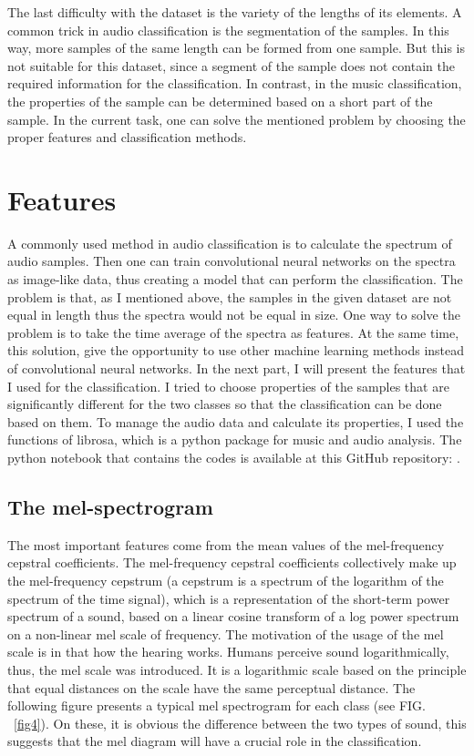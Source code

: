 \documentclass[12pt a4paper]{article}
\numberwithin{equation}{section}
\begin{document}
The last difficulty with the dataset is the variety of the lengths of its elements. A common trick in audio classification is the segmentation of the samples. In this way, more samples of the same length can be formed from one sample.  But this is not suitable for this dataset, since a segment of the sample does not contain the required information for the classification. In contrast, in the music classification, the properties of the sample can be determined based on a short part of the sample. In the current task, one can solve the mentioned problem by choosing the proper features and classification methods.

\section{Features}

A commonly used method in audio classification is to calculate the spectrum of audio samples. Then one can train convolutional neural networks on the spectra as image-like data, thus creating a model that can perform the classification. The problem is that, as I mentioned above, the samples in the given dataset are not equal in length thus the spectra would not be equal in size.  One way to solve the problem is to take the time average of the spectra as features. At the same time, this solution, give the opportunity to use other machine learning methods instead of convolutional neural networks. In the next part, I will present the features that I used for the classification. I tried to choose properties of the samples that are significantly different for the two classes so that the classification can be done based on them. To manage the audio data and calculate its properties, I used the functions of librosa, which is a python package for music and audio analysis. The python notebook that contains the codes is available at this GitHub repository: \cite{repo}.
 
\subsection{The mel-spectrogram}

The most important features come from the mean values of the mel-frequency cepstral coefficients. The mel-frequency cepstral coefficients collectively make up the mel-frequency cepstrum (a cepstrum is a spectrum of the logarithm of the spectrum of the time signal), which is a representation of the short-term power spectrum of a sound, based on a linear cosine transform of a log power spectrum on a non-linear mel scale of frequency. The motivation of the usage of the mel scale is in that how the hearing works.  Humans perceive sound logarithmically, thus, the mel scale was introduced. It is a logarithmic scale based on the principle that equal distances on the scale have the same perceptual distance. The following figure presents a typical mel spectrogram for each class (see FIG. ~\ref{fig4}). On these, it is obvious the difference between the two types of sound, this suggests that the mel diagram will have a crucial role in the classification.
\end{document}
